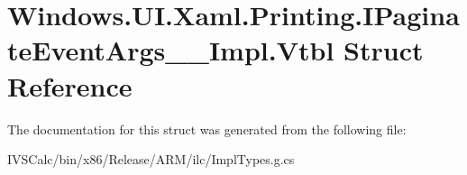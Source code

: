 \hypertarget{struct_windows_1_1_u_i_1_1_xaml_1_1_printing_1_1_i_paginate_event_args_____impl_1_1_vtbl}{}\section{Windows.\+U\+I.\+Xaml.\+Printing.\+I\+Paginate\+Event\+Args\+\_\+\+\_\+\+Impl.\+Vtbl Struct Reference}
\label{struct_windows_1_1_u_i_1_1_xaml_1_1_printing_1_1_i_paginate_event_args_____impl_1_1_vtbl}


The documentation for this struct was generated from the following file\+:\begin{DoxyCompactItemize}
\item 
I\+V\+S\+Calc/bin/x86/\+Release/\+A\+R\+M/ilc/Impl\+Types.\+g.\+cs\end{DoxyCompactItemize}
